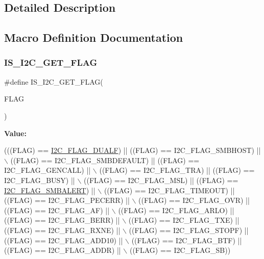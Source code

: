 \subsection{Detailed Description}


\subsection{Macro Definition Documentation}
\mbox{\label{group___i2_c__flags__definition_ga1a2c2a7c50cd8e33e532918106b4f6ce}} 
\subsubsection{\texorpdfstring{I\+S\+\_\+\+I2\+C\+\_\+\+G\+E\+T\+\_\+\+F\+L\+AG}{IS\_I2C\_GET\_FLAG}}
{\footnotesize\ttfamily \#define I\+S\+\_\+\+I2\+C\+\_\+\+G\+E\+T\+\_\+\+F\+L\+AG(\begin{DoxyParamCaption}\item[{}]{F\+L\+AG }\end{DoxyParamCaption})}

{\bfseries Value\+:}
\begin{DoxyCode}
(((FLAG) == \mbox{\hyperlink{group___i2_c__flags__definition_ga3755b783aa73568659478c2e2e45e27f}{I2C\_FLAG\_DUALF}}) || ((FLAG) == I2C\_FLAG\_SMBHOST) || \(\backslash\)
                               ((FLAG) == I2C\_FLAG\_SMBDEFAULT) || ((FLAG) == I2C\_FLAG\_GENCALL) || \(\backslash\)
                               ((FLAG) == I2C\_FLAG\_TRA) || ((FLAG) == I2C\_FLAG\_BUSY) || \(\backslash\)
                               ((FLAG) == I2C\_FLAG\_MSL) || ((FLAG) == 
      \mbox{\hyperlink{group___i2_c__flags__definition_ga4e1d7cd1574d03ba501c27483300c1be}{I2C\_FLAG\_SMBALERT}}) || \(\backslash\)
                               ((FLAG) == I2C\_FLAG\_TIMEOUT) || ((FLAG) == I2C\_FLAG\_PECERR) || \(\backslash\)
                               ((FLAG) == I2C\_FLAG\_OVR) || ((FLAG) == I2C\_FLAG\_AF) || \(\backslash\)
                               ((FLAG) == I2C\_FLAG\_ARLO) || ((FLAG) == I2C\_FLAG\_BERR) || \(\backslash\)
                               ((FLAG) == I2C\_FLAG\_TXE) || ((FLAG) == I2C\_FLAG\_RXNE) || \(\backslash\)
                               ((FLAG) == I2C\_FLAG\_STOPF) || ((FLAG) == I2C\_FLAG\_ADD10) || \(\backslash\)
                               ((FLAG) == I2C\_FLAG\_BTF) || ((FLAG) == I2C\_FLAG\_ADDR) || \(\backslash\)
                               ((FLAG) == I2C\_FLAG\_SB))
\end{DoxyCode}
